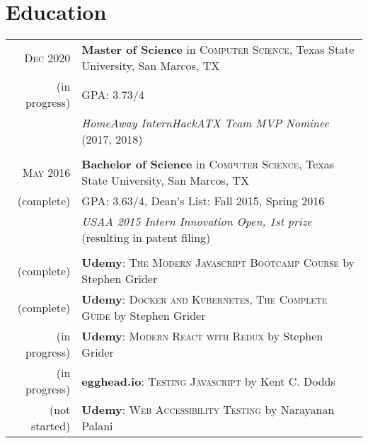 \documentclass[a4paper,10pt]{article}
\begin{document}
\section{Education}
\begin{tabular}{rl}	
	\textsc{Dec} 2020 & \textbf{Master of Science} in \textsc{Computer Science}, Texas State University, San Marcos, TX\\
	
	(in progress) &\normalsize \textsc{GPA}: 3.73/4 \\ 
	
	& \emph{HomeAway InternHackATX Team MVP Nominee} (2017, 2018) \\
	
	& \\
	
	\textsc{May} 2016 & \textbf{Bachelor of Science} in \textsc{Computer Science}, Texas State University, San Marcos, TX \\
	
	(complete) &\normalsize \textsc{GPA}: 3.63/4,  Dean's List: Fall 2015, Spring 2016 \\
	
	& \emph{USAA 2015 Intern Innovation Open, 1st prize} (resulting in patent filing)  \\
	
	& \\
	
	(complete) & \textbf{Udemy}: \textsc{The Modern Javascript Bootcamp Course} by Stephen Grider \\
	
	(complete) & \textbf{Udemy}: \textsc{Docker and Kubernetes, The Complete Guide} by Stephen Grider \\
	
	(in progress) & \textbf{Udemy}: \textsc{Modern React with Redux} by Stephen Grider \\
	
	(in progress) & \textbf{egghead.io}: \textsc{Testing Javascript} by Kent C. Dodds \\
	
	(not started) & \textbf{Udemy}: \textsc{Web Accessibility Testing} by Narayanan Palani \\
	
	
\end{tabular}

\end{document}
